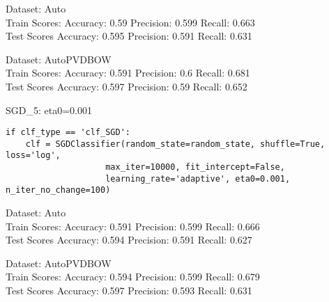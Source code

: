 \documentclass[11pt,preprint, authoryear]{elsarticle}
\numberwithin{equation}{section}
\numberwithin{figure}{section}
\numberwithin{table}{section}
\begin{document}
Dataset: Auto\\
Train Scores: Accuracy: 0.59 Precision: 0.599 Recall: 0.663\\
Test Scores Accuracy: 0.595 Precision: 0.591 Recall: 0.631

Dataset: AutoPVDBOW\\
Train Scores: Accuracy: 0.591 Precision: 0.6 Recall: 0.681\\
Test Scores Accuracy: 0.597 Precision: 0.59 Recall: 0.652

SGD\_5: eta0=0.001

\begin{verbatim}
if clf_type == 'clf_SGD':
    clf = SGDClassifier(random_state=random_state, shuffle=True, loss='log',
                    max_iter=10000, fit_intercept=False,
                    learning_rate='adaptive', eta0=0.001, n_iter_no_change=100)
\end{verbatim}

Dataset: Auto\\
Train Scores: Accuracy: 0.591 Precision: 0.599 Recall: 0.666\\
Test Scores Accuracy: 0.594 Precision: 0.591 Recall: 0.627

Dataset: AutoPVDBOW\\
Train Scores: Accuracy: 0.594 Precision: 0.599 Recall: 0.679\\
Test Scores Accuracy: 0.597 Precision: 0.593 Recall: 0.631


\end{document}
